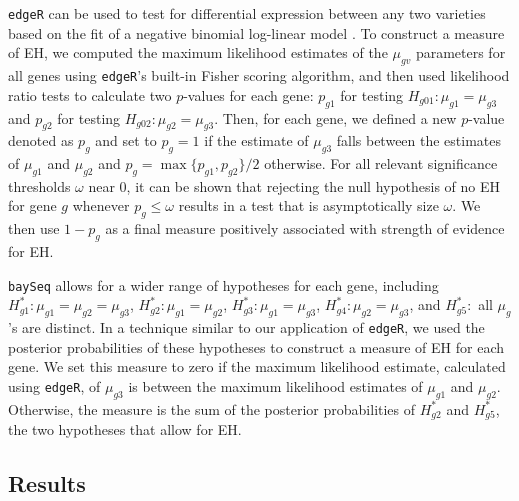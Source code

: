 \documentclass[useAMS,usenatbib,referee]{biom}
\newcommand{\edgeR}{{\tt edgeR}}
\newcommand{\baySeq}{{\tt baySeq}}
\begin{document}
\edgeR{} can be used to test for differential expression between any two varieties based on the fit of a negative binomial log-linear model \citep{robinson2007moderated, robinson2010edgeR}. To construct a measure of EH, we computed the maximum likelihood estimates of the $\mu_{gv}$ parameters for all genes using \edgeR{}'s built-in Fisher scoring algorithm, and then used likelihood ratio tests to calculate two $p$-values for each gene: $p_{g1}$  for testing $H_{g01}:\mu_{g1}=\mu_{g3}$ and $p_{g2}$ for testing $H_{g02}:\mu_{g2}=\mu_{g3}$. Then, for each gene, we defined a new $p$-value denoted as $p_g$ and set to $p_g=1$ if the estimate of $\mu_{g3}$ falls between the estimates of $\mu_{g1}$ and $\mu_{g2}$ and $p_g=\max\{p_{g1},p_{g2}\}/2$ otherwise. For all relevant significance thresholds $\omega$ near 0, it can be shown that rejecting the null hypothesis of no EH for gene $g$ whenever $p_g\leq \omega$ results in a test that is asymptotically size $\omega$.  We then use $1-p_g$ as a final measure positively associated with strength of evidence for EH. 

\baySeq{} allows for a wider range of hypotheses for each gene, including $H^*_{g1}: \mu_{g1}=\mu_{g2}=\mu_{g3}$, $H^*_{g 2}: \mu_{g1}=\mu_{g2}$, $H^*_{g 3}: \mu_{g1}=\mu_{g3}$, $H^*_{g 4}: \mu_{g2}=\mu_{g3}$, and $H^*_{g 5}:$ all $\mu_g$'s are distinct. In a technique similar to our application of \edgeR{}, we used the posterior probabilities of these hypotheses to construct a measure of EH for each gene. We set this measure to zero if the maximum likelihood estimate, calculated using \edgeR{}, of $\mu_{g3}$ is between the maximum likelihood estimates of $\mu_{g1}$ and $\mu_{g2}$. Otherwise, the measure is the sum of the posterior probabilities of $H^*_{g 2}$ and $H^*_{g 5}$, the two hypotheses that allow for EH.



\subsection{Results}
\end{document}
